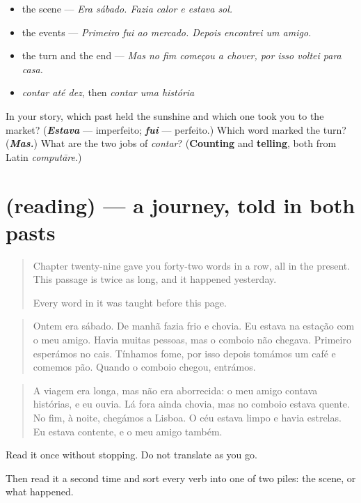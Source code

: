 \begin{itemize}
\raggedright
  \item the scene — \emph{Era sábado. Fazia calor e estava sol.}
  \item the events — \emph{Primeiro fui ao mercado. Depois encontrei um amigo.}
  \item the turn and the end — \emph{Mas no fim começou a chover, por isso voltei para casa.}
  \item \emph{contar até dez}, then \emph{contar uma história}
\end{itemize}

\begin{tcolorbox}[breakable,colback=teal!4,colframe=teal!35!black,title={Before you move on}]
In your story, which past held the sunshine and which one took you to the market? (\emph{\textbf{Estava}} — imperfeito; \emph{\textbf{fui}} — perfeito.) Which word marked the turn? (\emph{\textbf{Mas.}}) What are the two jobs of \emph{contar}? (\textbf{Counting} and \textbf{telling}, both from Latin \emph{computāre}.)
\end{tcolorbox}
\section[(reading)]{(reading) — a journey, told in both pasts}

\label{lesson:PT-C260-leitura}



\begin{quote}
Chapter twenty-nine gave you forty-two words in a row, all in the present. This passage is twice as long, and it happened yesterday.

Every word in it was taught before this page.
\end{quote}

\begin{tcolorbox}[breakable,skin=enhanced,colback=orange!6,colframe=orange!45!black,boxrule=0.5pt,arc=1mm,left=6pt,right=6pt,top=4pt,bottom=4pt,fonttitle=\bfseries,title={Read this}]
\begin{quote}
Ontem era sábado. De manhã fazia frio e chovia. Eu estava na estação com o meu amigo. Havia muitas pessoas, mas o comboio não chegava. Primeiro esperámos no cais. Tínhamos fome, por isso depois tomámos um café e comemos pão. Quando o comboio chegou, entrámos.
\end{quote}

\begin{quote}
A viagem era longa, mas não era aborrecida: o meu amigo contava histórias, e eu ouvia. Lá fora ainda chovia, mas no comboio estava quente. No fim, à noite, chegámos a Lisboa. O céu estava limpo e havia estrelas. Eu estava contente, e o meu amigo também.
\end{quote}

Read it once without stopping. Do not translate as you go.

Then read it a second time and sort every verb into one of two piles: the scene, or what happened.
\end{tcolorbox}

